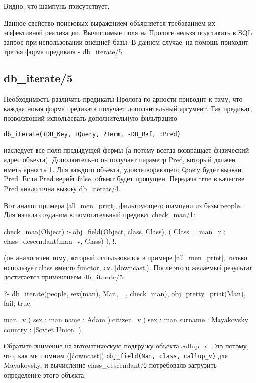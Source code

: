 \documentclass[a4paper]{book}
\begin{document}
Видно, что шампунь присутствует.

Данное свойство поисковых выражением объясняется требованием их
эффективной реализации. Вычислимые поля на Прологе нельзя
подставить в SQL запрос при использовании внешней базы. В данном
случае, на помощь приходит третья форма предиката -
db\_iterate/5.

\subsection{db\_iterate/5}

Необходимость различать предикаты Пролога по арности приводит к
тому, что каждая новая форма предиката получает дополнительный
аргумент. Так предикат, позволяющий использовать дополнительную
фильтрацию

\begin{verbatim}
db_iterate(+DB_Key, +Query, ?Term, -DB_Ref, :Pred)
\end{verbatim}

наследует все поля предыдущей формы (а потому всегда возвращает
физический адрес объекта). Дополнительно он получает параметр
Pred, который должен иметь арность 1. Для каждого объекта,
удовлетворяющего Query будет вызван Pred. Если Pred вернёт false,
объект будет пропущен. Передача true в качестве Pred аналогична
вызову db\_iterate/4.

Вот аналог примера \ref{all_men_print}, фильтрующего шампуни из
базы people. Для начала созданим вспомогательный предикат
check_man/1:

\begin{example}{}{}
check_man(Object) :- obj_field(Object, class, Class), 
   ( Class = man_v 
   ; class_descendant(man_v, Class)
   ), !.
\end{example}

(он аналогичен тому, который использовался в примере
\ref{all_men_print}, только использует class вместо functor,
см. \ref{downcast}). После этого желаемый результат достигается
применением db_iterate/5:

\begin{example}{}{}
?- db_iterate(people, sex(man), Man, _, check_man), 
   obj_pretty_print(Man), fail; true.

man_v ( 
  sex : man 
  name : Adam 
) 
citizen_v ( 
  sex : man 
  surname : Mayakovsky 
  country : [Soviet Union] 
) 
\end{example}

Обратите внимение на автоматическую подгрузку объекта
callup_v. Это потому, что, как мы помним (\ref{downcast})
\verb|obj_field(Man, class, callup_v)| для Mayakovsky, и
вычисление class_descendant/2 потребовало загрузить определение
этого объекта.
\end{document}
